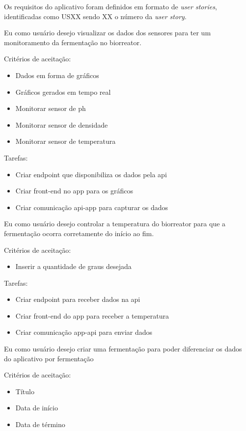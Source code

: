 Os requisitos do aplicativo foram definidos em formato de \textit{user stories}, identificadas como USXX sendo XX o número da \textit{user story}.


Eu como usuário desejo visualizar os dados dos sensores para ter um monitoramento da fermentação no biorreator.

Critérios de aceitação:
\begin{itemize}
  \item Dados em forma de gráficos
  \item Gráficos gerados em tempo real
  \item Monitorar sensor de ph
  \item Monitorar sensor de densidade
  \item Monitorar sensor de temperatura
\end{itemize}

Tarefas:
\begin{itemize}
  \item Criar endpoint que disponibiliza os dados pela api
  \item Criar front-end no app para os gráficos
  \item Criar comunicação api-app para capturar os dados
\end{itemize}


Eu como usuário desejo controlar a temperatura do biorreator para que a fermentação ocorra corretamente do início ao fim.

Critérios de aceitação:
\begin{itemize}
  \item Inserir a quantidade de graus desejada
\end{itemize}

Tarefas:
\begin{itemize}
  \item Criar endpoint para receber dados na api
  \item Criar front-end do app para receber a temperatura
  \item Criar comunicação app-api para enviar dados
\end{itemize}


Eu como usuário desejo criar uma fermentação para poder diferenciar os dados do aplicativo por fermentação

Critérios de aceitação:
\begin{itemize}
  \item Título
  \item Data de início
  \item Data de término
\end{itemize}

